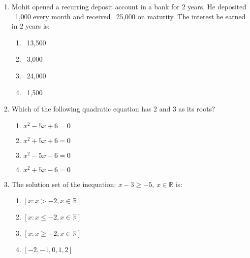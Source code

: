 \begin{enumerate}[label=(\roman*)]

    \item Mohit opened a recurring deposit account in a bank for 2 years. He 
        deposited \rupee~1,000 every month and received \rupee~25,000 on maturity. 
        The interest he earned in 2 years is:

        \begin{multicols}{2}
        \begin{enumerate}[label=(\alph*)]
            \item \rupee~13,500
            \item \rupee~3,000
            \item \rupee~24,000
            \item \rupee~1,500
        \end{enumerate}
        \end{multicols}

    \newpage
    \item Which of the following quadratic equation has 2 and 3 as its roots?

        \begin{multicols}{2}
        \begin{enumerate}[label=(\alph*)]
            \item $x^2 - 5x + 6 = 0$
            \item $x^2 + 5x + 6 = 0$
            \item $x^2 - 5x - 6 = 0$
            \item $x^2 + 5x - 6 = 0$
        \end{enumerate}
        \end{multicols}

    \item The solution set of the inequation: $x-3 \ge -5, \ x \in \mathbb{R}$ is:

        \begin{multicols}{2}
        \begin{enumerate}[label=(\alph*)]
            \item $[x:x > -2, x \in \mathbb{R}]$
            \item $[x:x \le -2, x \in \mathbb{R}]$
            \item $[x:x \ge -2, x \in \mathbb{R}]$
            \item $[-2, -1, 0, 1, 2]$
        \end{enumerate}
        \end{multicols}


\end{enumerate}
